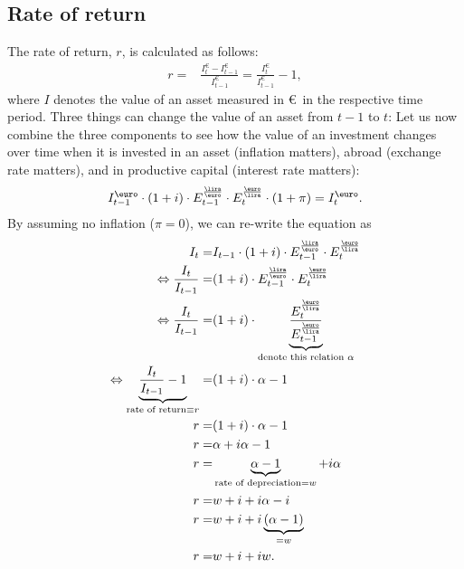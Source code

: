 \subsection{Rate of return}
The rate of return, $r$, is calculated as follows:
\begin{align*}
	r=& \frac{I^{\euro}_t-I_{t-1}^{\euro}}{I_{t-1}^{\euro}}=\frac{I^{\euro}_t}{I^{\euro}_{t-1}}-1  ,
\end{align*}
where $I$ denotes the value of an asset measured in \euro\ in the respective time period. Three things can change the value of an asset from $t-1$ to $t$:
Let us now combine the three components to see how the value of an investment changes over time when it is invested in an asset (inflation matters), abroad (exchange rate matters), and in productive capital (interest rate matters):
\begin{equation}\label{equ:Invest_t}
	I_{t-1}^{\euro} \cdot (1+i) \cdot E_{t-1}^{\frac{\lira}{\euro}} \cdot E_{t}^{\frac{\euro}{\lira}} \cdot  (1+\pi)  = I_{t}^{\euro}. 
\end{equation}
By assuming no inflation ($\pi=0$), we can re-write the equation as 
\begin{align}
	I_{t} =&	I_{t-1} \cdot (1+i) \cdot E_{t-1}^{\frac{\lira}{\euro}} \cdot E_{t}^{\frac{\euro}{\lira}} \\
	\Leftrightarrow \frac{I_{t} }{I_{t-1}}=&  (1+i) \cdot E_{t-1}^{\frac{\lira}{\euro}} \cdot E_{t}^{\frac{\euro}{\lira}}\label{equ:rear1} \\
	\Leftrightarrow \frac{I_{t} }{I_{t-1}}=&  (1+i) \cdot \underbrace{\frac{E_{t}^{\frac{\euro}{\lira}}}{E_{t-1}^{\frac{\euro}{\lira}}}}_{\textnormal{denote this relation } \alpha} \\
	\Leftrightarrow \underbrace{\frac{I_{t} }{I_{t-1}}-1}_{\textnormal{rate of return}\equiv r}=&  (1+i) \cdot \alpha-1\\
	r=&(1+i)\cdot \alpha -1 \\
	r=&\alpha+ i\alpha - 1\\
	r=& \underbrace{\alpha-1}_{\textnormal{rate of depreciation}=w} + i\alpha\\
	r=& w + i+ i\alpha-i\\
	r=& w + i+ i\underbrace{(\alpha-1)}_{=w}\\
	r=& w + i+ iw\label{equ:rear2}.
\end{align}

